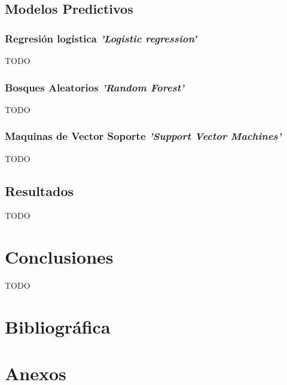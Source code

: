 \documentclass[10pt,a4paper,oneside]{book}
\begin{document}
\newpage
\section{Modelos Predictivos}

\subsection{Regresión logística \textit{'Logistic regression'}}
TODO

\subsection{Bosques Aleatorios \textit{'Random Forest'}}
TODO

\subsection{Maquinas de Vector Soporte \textit{'Support Vector Machines'}}
TODO

\newpage
\section{Resultados}
TODO

\newpage
\chapter{Conclusiones}
TODO

\chapter{Bibliográfica}

\cleardoublepage
{}
{}
\listoffigures

\chapter{Anexos}
\end{document}
